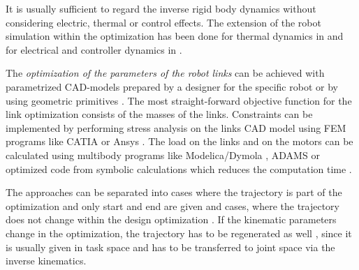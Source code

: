 \documentclass{svproc}
\begin{document}
It is usually sufficient to regard the inverse rigid body dynamics without considering electric, thermal or control effects.
The extension of the robot simulation within the optimization has been done for thermal dynamics in \cite{ChedmailGau1990} and for electrical and controller dynamics in \cite{Padilla-GarciaCruRod2015}.


The \emph{optimization of the parameters of the robot links} can be achieved with parametrized CAD-models prepared by a designer for the specific robot \cite{TarkianPerOelFen2011,ZhouBai2015} or by using geometric primitives \cite{RamirezKotOrt2017}. %
The most straight-forward objective function for the link optimization consists of the masses of the links.
Constraints can be implemented by performing stress analysis on the links CAD model using FEM programs like CATIA \cite{TarkianPerOelFen2011} or Ansys \cite{ZhouBai2015}.
The load on the links and on the motors can be calculated using multibody programs like Modelica/Dymola \cite{TarkianPerOelFen2011}, ADAMS \cite{ZhouBaiHan2011} or optimized code from symbolic calculations \cite{ChedmailGau1990} which reduces the computation time \cite{KhalilDom2002}.

The approaches can be separated into cases where the trajectory is part of the optimization and only start and end are given \cite{PetterssonAndKru2005,PetterssonOel2009,TarkianPerOelFen2011} and cases, where the trajectory does not change within the design optimization \cite{TarkianPerOelFen2011,ZhouBaiHan2011,Padilla-GarciaCruRod2015}.
If the kinematic parameters change in the optimization, the trajectory has to be regenerated as well \cite{TarkianLunOel2008,ZhouBai2015}, since it is usually given in task space and has to be transferred to joint space via the inverse kinematics.
\end{document}
